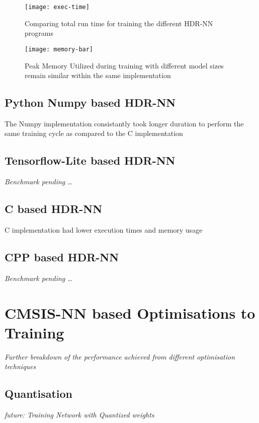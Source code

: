 \begin{figure}[ht]
	\centering
	\texttt{[image: exec-time]}
	\caption[Execution Time vs Model Parameters]{Comparing total run time for training the different HDR-NN programs}
\end{figure}

\begin{figure}[ht]
	\centering
	\texttt{[image: memory-bar]}
	\caption[Peak Memory Utilisation]{Peak Memory Utilized during training with different model sizes remain similar within the same implementation}
\end{figure}

\subsection[Python - Numpy]{Python Numpy based HDR-NN}

The Numpy implementation consistantly took longer duration to perform the same training cycle as compared to the C implementation

\subsection[Tensorflow Lite]{Tensorflow-Lite based HDR-NN}
\textit{Benchmark pending \dots}

\subsection[C]{C based HDR-NN}

C implementation had lower execution times and memory usage

\subsection[CPP - Eigen]{CPP based HDR-NN}
\textit{Benchmark pending \dots}

\section{CMSIS-NN based Optimisations to Training}
\textit{Further breakdown of the performance achieved from different optimisation techniques}

\subsection{Quantisation}
\textit{future: Training Network with Quantized weights}

